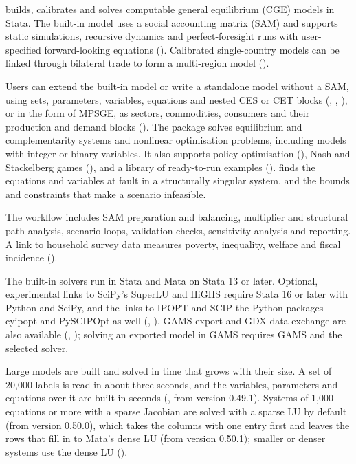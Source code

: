 

\pkg builds, calibrates and solves computable general equilibrium (CGE)
models in Stata. The built-in model uses a social accounting matrix (SAM)
and supports static simulations, recursive dynamics and perfect-foresight
runs with user-specified forward-looking equations ().
Calibrated single-country models can be linked through bilateral trade to
form a multi-region model ().

Users can extend the built-in model or write a standalone model without a
SAM, using sets, parameters, variables, equations and nested CES or CET
blocks (, , ), or in
the form of MPSGE, as sectors, commodities, consumers and their production
and demand blocks (). The package solves equilibrium and
complementarity systems and nonlinear optimisation problems, including
models with integer or binary variables. It also supports policy
optimisation (), Nash and Stackelberg games
(), and a library of ready-to-run examples
().  finds the equations and
variables at fault in a structurally singular system, and 
the bounds and constraints that make a scenario infeasible.

The workflow includes SAM preparation and balancing, multiplier and
structural path analysis, scenario loops, validation checks, sensitivity
analysis and reporting. A link to household survey data measures poverty,
inequality, welfare and fiscal incidence ().

The built-in solvers run in Stata and Mata on Stata 13 or later. Optional,
experimental links to SciPy's SuperLU and HiGHS require Stata 16 or later
with Python and SciPy, and the links to IPOPT and SCIP the Python packages
cyipopt and PySCIPOpt as well (, ). GAMS export
and GDX data exchange are also available (,
); solving an exported model in GAMS requires GAMS and the
selected solver.

Large models are built and solved in time that grows with their size. A set
of 20,000 labels is read in about three seconds, and the variables,
parameters and equations over it are built in seconds (,
from version 0.49.1). Systems of 1,000 equations or more with a sparse
Jacobian are solved with a sparse LU by default (from version 0.50.0), which
takes the columns with one entry first and leaves the rows that fill in to
Mata's dense LU (from version 0.50.1); smaller or denser systems use the
dense LU ().

